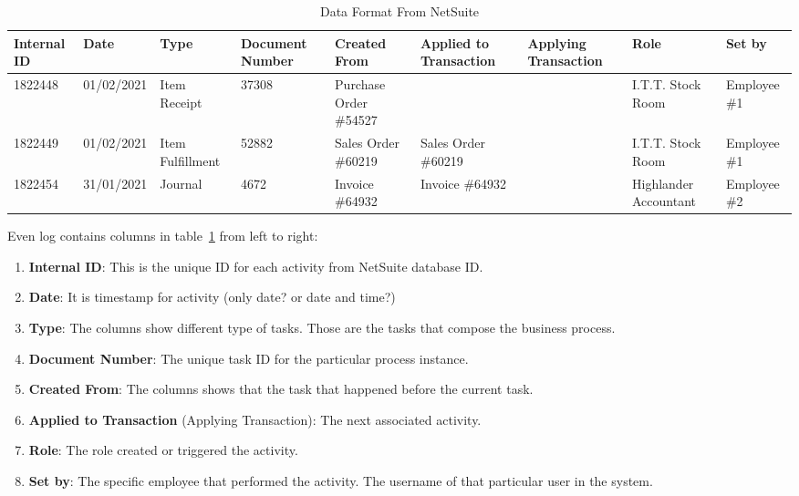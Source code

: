 \begin{table}[htb]
\scriptsize %
\begin{tabularx}{\textwidth}{|X|X|X|X|X|X|X|X|X|}
\hline
Internal ID & Date & Type & Document Number & Created From & Applied to Transaction & Applying Transaction & Role & Set by\\
\hline
1822448 & 01/02/2021 & Item Receipt &	37308 &	Purchase Order \#54527 &  &   & I.T.T. Stock Room & Employee \#1\\
\hline
1822449 & 01/02/2021 & Item Fulfillment &	52882 &	Sales Order \#60219 & Sales Order \#60219  &   & I.T.T. Stock Room & Employee \#1\\
\hline
1822454 &	31/01/2021 &	Journal &	4672 &	Invoice \#64932 &	Invoice \#64932 &	& Highlander Accountant &	Employee \#2 \\
\hline
\end{tabularx}
\caption{Data Format From NetSuite}
\label{table:dataformat}
\end{table}


Even log contains columns in table~\ref{table:dataformat} from left to right:
\begin{enumerate}
    \item \textbf{Internal ID}: This is the unique ID for each activity from NetSuite database ID.
    \item \textbf{Date}: It is timestamp for activity (only date? or date and time?)
    \item \textbf{Type}: The columns show different type of tasks. Those are the tasks that compose the business process.
    \item \textbf{Document Number}: The unique task ID for the particular process instance.
    \item \textbf{Created From}: The columns shows that the task that happened before the current task.
    \item \textbf{Applied to Transaction} (Applying Transaction): The next associated activity.
    \item \textbf{Role}: The role created or triggered the activity.
    \item \textbf{Set by}: The specific employee that performed the activity. The username of that particular user in the system.
\end{enumerate}




